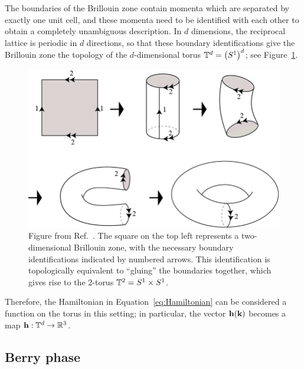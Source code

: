 The boundaries of the Brillouin zone contain momenta which are separated by exactly one unit cell, and these momenta need to be identified with each other to obtain a completely unambiguous description. In $d$ dimensions, the reciprocal lattice is periodic in $d$ directions, so that these boundary identifications give the Brillouin zone the topology of the $d$-dimensional torus $\mathbb{T}^d = \big(S^1\big)^d$; see Figure~\ref{fig:torus}.
\begin{figure}[htb!]
	\centering
	\includegraphics[width=.7\linewidth]{Images/torus}
	\caption{Figure from Ref.~\cite{Potoczak_torus}. The square on the top left represents a two-dimensional Brillouin zone, with the necessary boundary identifications indicated by numbered arrows. This identification is topologically equivalent to ``gluing'' the boundaries together, which gives rise to the 2-torus $\mathbb{T}^2 = S^1\times S^1$.}
	\label{fig:torus}
\end{figure}
Therefore, the Hamiltonian in Equation~\eqref{eq:Hamiltonian} can be considered a function on the torus in this setting; in particular, the vector $\vb{h}(\vb{k})$ becomes a map $\vb{h}: \mathbb{T}^d\to\mathbb{R}^3$.


\subsection{Berry phase}\label{sec:Berry}

